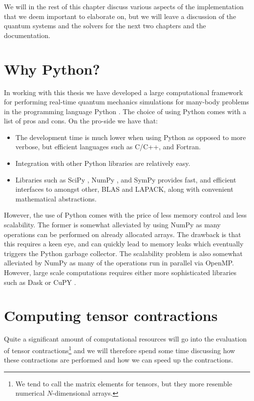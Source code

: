     We will in the rest of this chapter discuss various aspects of the
    implementation that we deem important to elaborate on, but we will leave
    a discussion of the quantum systems and the solvers for the next two
    chapters and the documentation.

    \section{Why Python?}
        In working with this thesis we have developed a large computational
        framework for performing real-time quantum mechanics simulations for
        many-body problems in the programming language Python \cite{python}.
        The choice of using Python comes with a list of pros and cons.
        On the pro-side we have that:
        \begin{itemize}
            \item The development time is much lower when using Python as
                opposed to more verbose, but efficient languages such as C/C++,
                and Fortran.
            \item Integration with other Python libraries are relatively easy.
            \item Libraries such as SciPy \cite{scipy}, NumPy \cite{numpy}, and
                SymPy \cite{sympy} provides fast, and efficient interfaces to
                amongst other, BLAS and LAPACK, along with convenient
                mathematical abstractions.
        \end{itemize}
        However, the use of Python comes with the price of less memory control
        and less scalability.
        The former is somewhat alleviated by using NumPy as many operations can
        be performed on already allocated arrays.
        The drawback is that this requires a keen eye, and can quickly lead to
        memory leaks which eventually triggers the Python garbage collector.
        The scalability problem is also somewhat alleviated by NumPy as many of
        the operations run in parallel via OpenMP.
        However, large scale computations requires either more sophisticated
        libraries such as Dask \cite{dask} or CuPY \cite{cupy}.

    \section{Computing tensor contractions}
        Quite a significant amount of computational resources will go into the
        evaluation of tensor contractions\footnote{%
            We tend to call the matrix elements for tensors, but they more
            resemble numerical $N$-dimensional arrays.%
        } and we will therefore spend some time discussing how these
        contractions are performed and how we can speed up the contractions.

